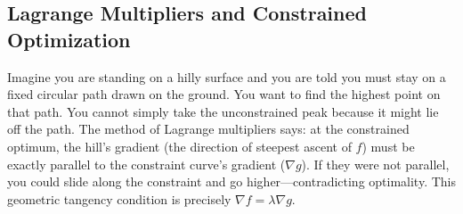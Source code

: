 \documentclass[12pt,a4paper]{article}
\begin{document}
\subsection{Lagrange Multipliers and Constrained Optimization}

Imagine you are standing on a hilly surface and you are told you must stay on a fixed circular path drawn on the ground. You want to find the highest point on that path. You cannot simply take the unconstrained peak because it might lie off the path. The method of Lagrange multipliers says: at the constrained optimum, the hill's gradient (the direction of steepest ascent of $f$) must be exactly parallel to the constraint curve's gradient ($\nabla g$). If they were not parallel, you could slide along the constraint and go higher---contradicting optimality. This geometric tangency condition is precisely $\nabla f = \lambda \nabla g$.
\end{document}
